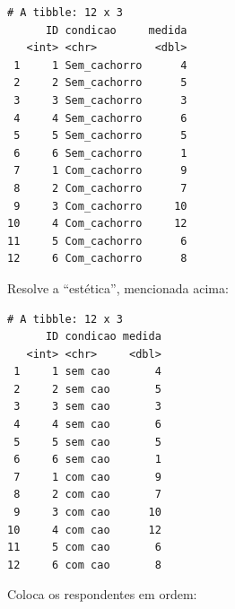 \documentclass[
]{article}
\newenvironment{Shaded}{\begin{snugshade}}{\end{snugshade}}
\newcommand{\CommentTok}[1]{\textcolor[rgb]{0.56,0.35,0.01}{\textit{#1}}}
\newcommand{\ConstantTok}[1]{\textcolor[rgb]{0.00,0.00,0.00}{#1}}
\newcommand{\FunctionTok}[1]{\textcolor[rgb]{0.00,0.00,0.00}{#1}}
\newcommand{\NormalTok}[1]{#1}
\newcommand{\OtherTok}[1]{\textcolor[rgb]{0.56,0.35,0.01}{#1}}
\newcommand{\SpecialCharTok}[1]{\textcolor[rgb]{0.00,0.00,0.00}{#1}}
\newcommand{\StringTok}[1]{\textcolor[rgb]{0.31,0.60,0.02}{#1}}
\begin{document}
\begin{verbatim}
# A tibble: 12 x 3
      ID condicao     medida
   <int> <chr>         <dbl>
 1     1 Sem_cachorro      4
 2     2 Sem_cachorro      5
 3     3 Sem_cachorro      3
 4     4 Sem_cachorro      6
 5     5 Sem_cachorro      5
 6     6 Sem_cachorro      1
 7     1 Com_cachorro      9
 8     2 Com_cachorro      7
 9     3 Com_cachorro     10
10     4 Com_cachorro     12
11     5 Com_cachorro      6
12     6 Com_cachorro      8
\end{verbatim}

Resolve a ``estética'', mencionada acima:

\begin{Shaded}
\end{Shaded}

\begin{verbatim}
# A tibble: 12 x 3
      ID condicao medida
   <int> <chr>     <dbl>
 1     1 sem cao       4
 2     2 sem cao       5
 3     3 sem cao       3
 4     4 sem cao       6
 5     5 sem cao       5
 6     6 sem cao       1
 7     1 com cao       9
 8     2 com cao       7
 9     3 com cao      10
10     4 com cao      12
11     5 com cao       6
12     6 com cao       8
\end{verbatim}

Coloca os respondentes em ordem:

\begin{Shaded}
\end{Shaded}
\end{document}
